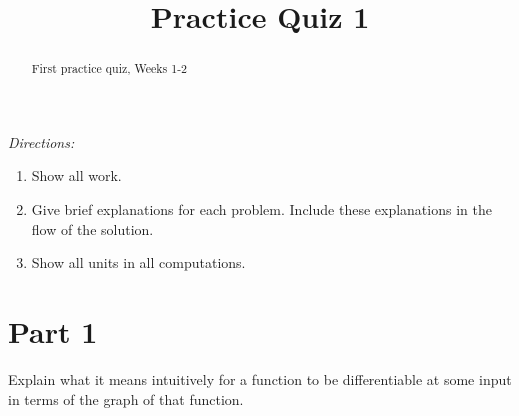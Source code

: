 \documentclass{ximera}
\title{Practice Quiz 1}
\begin{document}
\begin{abstract}
First practice quiz, Weeks 1-2
\end{abstract}
\maketitle

\emph{Directions:}

\begin{enumerate}
\item Show all work.

\item Give brief explanations for each problem. Include these explanations in the flow of the solution.

\item Show all units in all computations.
\end{enumerate}


\section{Part 1}

\begin{question}  \label{Q4t5tgwertftggf}
Explain what it means intuitively for a function to be differentiable at some input in terms of the graph of that function.
\end{question}
\end{document}

